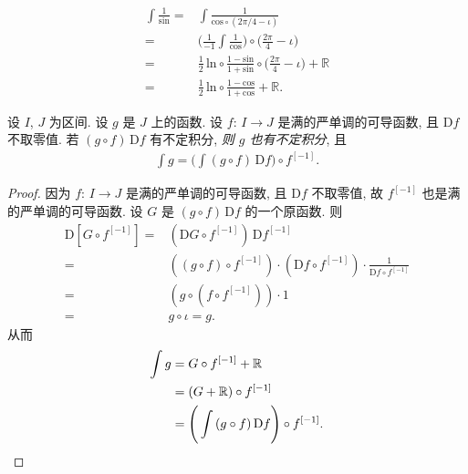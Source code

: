 \begin{example}
    \begin{align*}
        \int {\frac{1}{\mathrm{sin}}}
        = {} & \int {\frac{1}{\mathrm{cos} \circ (2\pi/4 - \iota)}}                     \\
        = {} & \Bigg( \frac{1}{-1} \int {\frac{1}{\mathrm{cos}}} \Bigg)
        \circ \bigg( \frac{2\pi}{4} - \iota \bigg)                                      \\
        = {} & \frac{1}{2}\,\mathrm{ln} \circ
        \frac{1 - \mathrm{sin}}{1 + \mathrm{sin}} \circ
        \bigg( \frac{2\pi}{4} - \iota \bigg) + \mathbb{R}                               \\
        = {} & \frac{1}{2}\,\mathrm{ln} \circ \frac{1 - \mathrm{cos}}{1 + \mathrm{cos}}
        + \mathbb{R}.
    \end{align*}
\end{example}

\begin{theorem}
    设 $I$, $J$ 为区间.
    设 $g$ 是 $J$ 上的函数.
    设 $f$: $I \to J$ 是满的严单调的可导函数,
    且 $\mathrm{D}f$ 不取零值.
    若 $(g \circ f)\,\mathrm{D}f$ 有不定积分,
    \emph{则 $g$ 也有不定积分}, 且
    \begin{align*}
        \int {g} = \Bigg( \int {(g \circ f)\,\mathrm{D}f} \Bigg) \circ f^{[-1]}.
    \end{align*}
\end{theorem}

\begin{proof}
    因为 $f$: $I \to J$ 是满的严单调的可导函数,
    且 $\mathrm{D}f$ 不取零值,
    故 $f^{[-1]}$ 也是满的严单调的可导函数.
    设 $G$ 是 $(g \circ f)\,\mathrm{D}f$ 的一个原函数.
    则
    \begin{align*}
        \mathrm{D}[G \circ f^{[-1]}]
        = {} & (\mathrm{D}G \circ f^{[-1]})\, \mathrm{D}f^{[-1]}                                                         \\
        = {} & ((g \circ f)\circ f^{[-1]}) \cdot (\mathrm{D}f \circ f^{[-1]}) \cdot \frac{1}{\mathrm{D}f \circ f^{[-1]}} \\
        = {} & (g \circ (f \circ f^{[-1]})) \cdot 1                                                                      \\
        = {} & g \circ \iota = g.
    \end{align*}
    从而
    \begin{align*}
        \int {g}
        = {} & G \circ f^{[-1]} + \mathbb{R}                                          \\
        = {} & (G + \mathbb{R}) \circ f^{[-1]}                                        \\
        = {} & \Bigg( \int {(g \circ f)\,\mathrm{D}f} \Bigg) \circ f^{[-1]}. \qedhere
    \end{align*}
\end{proof}

